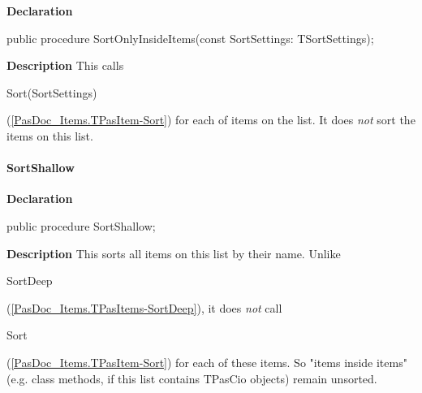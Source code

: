 \documentclass{report}
\newif\ifpdf
\begin{document}
\label{PasDoc_Items.TPasItems-SortOnlyInsideItems}
\begin{list}{}{
\setlength{\itemindent}{0cm}
\setlength{\listparindent}{0cm}
\setlength{\leftmargin}{\evensidemargin}
\addtolength{\leftmargin}{\tmplength}
\settowidth{\labelsep}{X}
\addtolength{\leftmargin}{\labelsep}
\setlength{\labelwidth}{\tmplength}
}
\item[\textbf{Declaration}\hfill]
\ifpdf
\begin{flushleft}
\fi
\begin{ttfamily}
public procedure SortOnlyInsideItems(const SortSettings: TSortSettings);\end{ttfamily}

\ifpdf
\end{flushleft}
\fi

\par
\item[\textbf{Description}]
This calls \begin{ttfamily}Sort(SortSettings)\end{ttfamily}(\ref{PasDoc_Items.TPasItem-Sort}) for each of items on the list. It does \textit{not} sort the items on this list.

\end{list}
\paragraph*{SortShallow}\hspace*{\fill}

\label{PasDoc_Items.TPasItems-SortShallow}
\begin{list}{}{
\setlength{\itemindent}{0cm}
\setlength{\listparindent}{0cm}
\setlength{\leftmargin}{\evensidemargin}
\addtolength{\leftmargin}{\tmplength}
\settowidth{\labelsep}{X}
\addtolength{\leftmargin}{\labelsep}
\setlength{\labelwidth}{\tmplength}
}
\item[\textbf{Declaration}\hfill]
\ifpdf
\begin{flushleft}
\fi
\begin{ttfamily}
public procedure SortShallow;\end{ttfamily}

\ifpdf
\end{flushleft}
\fi

\par
\item[\textbf{Description}]
This sorts all items on this list by their name. Unlike \begin{ttfamily}SortDeep\end{ttfamily}(\ref{PasDoc_Items.TPasItems-SortDeep}), it does \textit{not} call \begin{ttfamily}Sort\end{ttfamily}(\ref{PasDoc_Items.TPasItem-Sort}) for each of these items. So "items inside items" (e.g. class methods, if this list contains TPasCio objects) remain unsorted.

\end{list}
\end{document}
